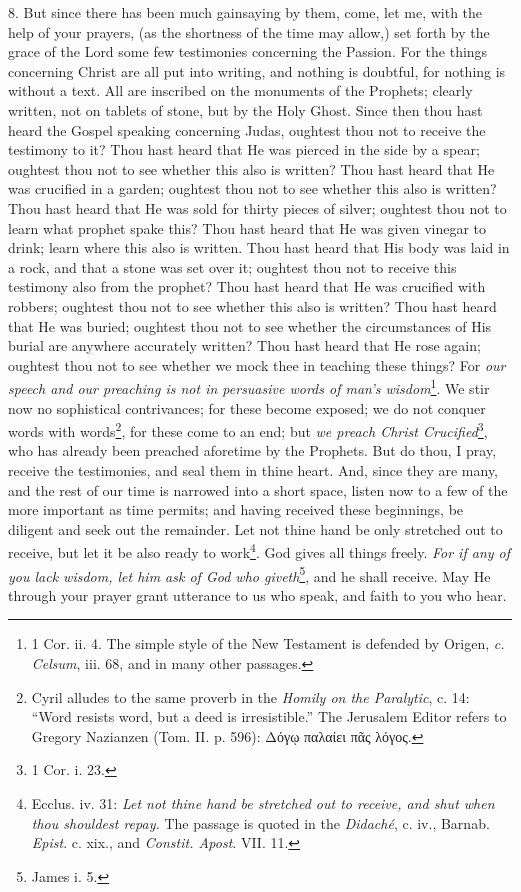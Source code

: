 8. But since there has been much gainsaying by them, come, let me, with the help of your prayers, (as the shortness of the time may allow,) set forth by the grace of the Lord some few testimonies concerning the Passion. For the things concerning Christ are all put into writing, and nothing is doubtful, for nothing is without a text. All are inscribed on the monuments of the Prophets; clearly written, not on tablets of stone, but by the Holy Ghost. Since then thou hast heard the Gospel speaking concerning Judas, oughtest thou not to receive the testimony to it? Thou hast heard that He was pierced in the side by a spear; oughtest thou not to see whether this also is written? Thou hast heard that He was crucified in a garden; oughtest thou not to see whether this also is written? Thou hast heard that He was sold for thirty pieces of silver; oughtest thou not to learn what prophet spake this? Thou hast heard that He was given vinegar to drink; learn where this also is written. Thou hast heard that His body was laid in a rock, and that a stone was set over it; oughtest thou not to receive this testimony also from the prophet? Thou hast heard that He was crucified with robbers; oughtest thou not to see whether this also is written? Thou hast heard that He was buried; oughtest thou not to see whether the circumstances of His burial are anywhere accurately written? Thou hast heard that He rose again; oughtest thou not to see whether we mock thee in teaching these things? For \emph{our speech and our preaching is not in persuasive words of man’s wisdom}\footnote{1 Cor. ii. 4. The simple style of the New Testament is defended by Origen, \emph{c. Celsum}, iii. 68, and in many other passages.}. We stir now no sophistical contrivances; for these become exposed; we do not conquer words with words\footnote{Cyril alludes to the same proverb in the \emph{Homily on the Paralytic}, c. 14: “Word resists word, but a deed is irresistible.” The Jerusalem Editor refers to Gregory Nazianzen (Tom. II. p. 596): \textgreek{Δόγῳ παλαίει πᾶς λόγος}.}, for these come to an end; but \emph{we preach Christ Crucified}\footnote{1 Cor. i. 23.}, who has already been preached aforetime by the Prophets. But do thou, I pray, receive the testimonies, and seal them in thine heart. And, since they are many, and the rest of our time is narrowed into a short space, listen now to a few of the more important as time permits; and having received these beginnings, be diligent and seek out the remainder. Let not thine hand be only stretched out to receive, but let it be also ready to work\footnote{Ecclus. iv. 31: \emph{Let not thine hand be stretched out to receive, and shut when thou shouldest repay.} The passage is quoted in the \emph{Didaché}, c. iv., Barnab. \emph{Epist}. c. xix., and \emph{Constit. Apost}. VII. 11.}. God gives all things freely. \emph{For if any of you lack wisdom, let him ask of God who giveth}\footnote{James i. 5.}, and he shall receive. May He through your prayer grant utterance to us who speak, and faith to you who hear.

